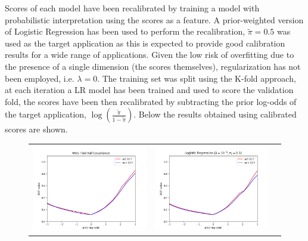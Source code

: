 \documentclass[12pt,a4paper]{article}
\begin{document}
Scores of each model have been recalibrated by training a model with probabilistic interpretation using the scores as a feature.
A prior-weighted version of Logistic Regression has been used to perform the recalibration, $\tilde{\pi} = 0.5$ was used as the target application as this is expected to provide good calibration results for a wide range of applications.
Given the low risk of overfitting due to the presence of a single dimension (the scores themselves), regularization has not been employed, i.e. $\lambda = 0$.
The training set was split using the K-fold approach, at each iteration a LR model has been trained and used to score the validation fold, the scores have been then recalibrated by subtracting the prior log-odds of the target application, $\log{(\frac{\tilde{\pi}}{1-\tilde{\pi}})}$.
Below the results obtained using calibrated scores are shown.

\begin{figure}[H]
    \begin{center}
        \hspace*{-25pt}
        \begin{tabular}{ccc}
            \includegraphics[width = 200pt]{img/bayes/recalibrated-mvg.png} &
            \includegraphics[width = 200pt]{img/bayes/recalibrated-lr.png}    \\
        \end{tabular}
    \end{center}
\end{figure}
\end{document}
